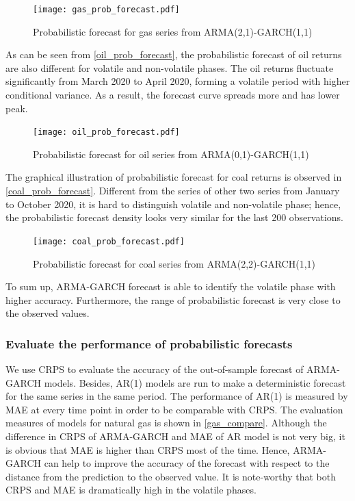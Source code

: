 \documentclass[12pt,a4paper]{article}
\newcommand\colorAutoref[1]{{\hypersetup{linkcolor=black}\autoref{#1}}}
\numberwithin{equation}{section}
\begin{document}
\begin{figure}[h!] 
\texttt{[image: gas\_prob\_forecast.pdf]}
\vspace*{-13mm}
\caption{Probabilistic forecast for gas series from ARMA(2,1)-GARCH(1,1)}
\label{gas_prob_forecast}
\end{figure}

As can be seen from \colorAutoref{oil_prob_forecast}, the probabilistic forecast of oil returns are also different for volatile and non-volatile phases. The oil returns fluctuate significantly from March 2020 to April 2020, forming a volatile period with higher conditional variance. As a result, the forecast curve spreads more and has lower peak. 


\begin{figure}[h!] 
\texttt{[image: oil\_prob\_forecast.pdf]}
\vspace*{-13mm}
\caption{Probabilistic forecast for oil series from ARMA(0,1)-GARCH(1,1)}
\label{oil_prob_forecast}
\end{figure}



The graphical illustration of probabilistic forecast for coal returns is observed in \colorAutoref{coal_prob_forecast}. Different from the series of other two series from January to October 2020, it is hard to distinguish volatile and non-volatile phase; hence, the probabilistic forecast density looks very similar for the last 200 observations. 

\begin{figure}[h!] 
\texttt{[image: coal\_prob\_forecast.pdf]}
\vspace*{-13mm}
\caption{Probabilistic forecast for coal series from ARMA(2,2)-GARCH(1,1)}
\label{coal_prob_forecast}
\end{figure}

To sum up, ARMA-GARCH forecast is able to identify the volatile phase with higher accuracy. Furthermore, the range of probabilistic forecast is very close to the observed values. 

\subsubsection{Evaluate the performance of probabilistic forecasts}
We use CRPS to evaluate the accuracy of the out-of-sample forecast of ARMA-GARCH models. Besides, AR(1) models are run to make a deterministic forecast for the same series in the same period. The performance of AR(1) is measured by MAE at every time point in order to be comparable with CRPS. The evaluation measures of models for natural gas is shown in \colorAutoref{gas_compare}. Although the difference in CRPS of ARMA-GARCH and MAE of AR model is not very big, it is obvious that MAE is higher than CRPS most of the time. Hence, ARMA-GARCH can help to improve the accuracy of the forecast with respect to the distance from the prediction to the observed value. It is note-worthy that both CRPS and MAE is dramatically high in the volatile phases. 
\end{document}
